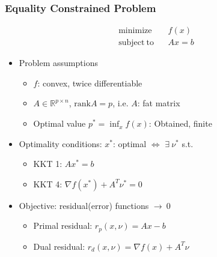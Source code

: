 \subsubsection*{Equality Constrained Problem}
\begin{equation}\begin{aligned}
    \mathrm{minimize}~~&~~f(x) \\
    \mathrm{subject~to}~~&~~Ax=b
\end{aligned}\end{equation}
\begin{itemize}
    \item Problem assumptions
    \begin{itemize}
        \item $f$: convex, twice differentiable
        \item $A\in\mathbb{R}^{p\times n}$, $\mathrm{rank}A=p$, i.e. $A$: fat matrix
        \item Optimal value $p^\ast = \inf_x f(x)$: Obtained, finite
    \end{itemize}
    \newpage
    \item Optimality conditions: $x^\ast$: optimal $\Leftrightarrow$ $\exists~\nu^\ast$ s.t.
    \begin{itemize}
        \item KKT 1: $Ax^\ast=b$
        \item KKT 4: $\nabla f(x^\ast)+A^T\nu^\ast=0$
    \end{itemize}
    \item Objective: residual(error) functions $\rightarrow~0$
    \begin{itemize}
        \item Primal residual: $r_p(x,\nu)=Ax-b$
        \item Dual residual: $r_d(x,\nu)=\nabla f(x)+A^T\nu$
    \end{itemize}
\end{itemize}

